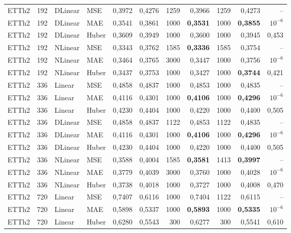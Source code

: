 {\begin{longtable}{@{}lrll rr rr rr r@{}}
\addlinespace[2pt]
ETTh2 & 192 & DLinear & MSE & 0{,}3972 & 0{,}4276 & 1259 & 0{,}3966 & 1259 & 0{,}4273 & -- \\
ETTh2 & 192 & DLinear & MAE & 0{,}3541 & 0{,}3861 & 1000 & \textbf{0{,}3531} & 1000 & \textbf{0{,}3855} & $10^{-6}$ \\
ETTh2 & 192 & DLinear & Huber & 0{,}3609 & 0{,}3949 & 1000 & 0{,}3600 & 1000 & 0{,}3945 & 0{,}453 \\
\addlinespace[2pt]
ETTh2 & 192 & NLinear & MSE & 0{,}3343 & 0{,}3762 & 1585 & \textbf{0{,}3336} & 1585 & 0{,}3754 & -- \\
ETTh2 & 192 & NLinear & MAE & 0{,}3464 & 0{,}3765 & 3000 & 0{,}3447 & 1000 & 0{,}3756 & $10^{-6}$ \\
ETTh2 & 192 & NLinear & Huber & 0{,}3437 & 0{,}3753 & 1000 & 0{,}3427 & 1000 & \textbf{0{,}3744} & 0{,}421 \\
\addlinespace[2pt]
ETTh2 & 336 & Linear & MSE & 0{,}4858 & 0{,}4837 & 1000 & 0{,}4853 & 1000 & 0{,}4835 & -- \\
ETTh2 & 336 & Linear & MAE & 0{,}4116 & 0{,}4301 & 1000 & \textbf{0{,}4106} & 1000 & \textbf{0{,}4296} & $10^{-6}$ \\
ETTh2 & 336 & Linear & Huber & 0{,}4230 & 0{,}4404 & 1000 & 0{,}4220 & 1000 & 0{,}4400 & 0{,}505 \\
\addlinespace[2pt]
ETTh2 & 336 & DLinear & MSE & 0{,}4858 & 0{,}4837 & 1122 & 0{,}4853 & 1122 & 0{,}4835 & -- \\
ETTh2 & 336 & DLinear & MAE & 0{,}4116 & 0{,}4301 & 1000 & \textbf{0{,}4106} & 1000 & \textbf{0{,}4296} & $10^{-6}$ \\
ETTh2 & 336 & DLinear & Huber & 0{,}4230 & 0{,}4404 & 1000 & 0{,}4220 & 1000 & 0{,}4400 & 0{,}505 \\
\addlinespace[2pt]
ETTh2 & 336 & NLinear & MSE & 0{,}3588 & 0{,}4004 & 1585 & \textbf{0{,}3581} & 1413 & \textbf{0{,}3997} & -- \\
ETTh2 & 336 & NLinear & MAE & 0{,}3779 & 0{,}4039 & 3000 & 0{,}3760 & 1000 & 0{,}4028 & $10^{-6}$ \\
ETTh2 & 336 & NLinear & Huber & 0{,}3738 & 0{,}4018 & 1000 & 0{,}3727 & 1000 & 0{,}4008 & 0{,}470 \\
\addlinespace[2pt]
ETTh2 & 720 & Linear & MSE & 0{,}7407 & 0{,}6116 & 1000 & 0{,}7404 & 1122 & 0{,}6115 & -- \\
ETTh2 & 720 & Linear & MAE & 0{,}5898 & 0{,}5337 & 1000 & \textbf{0{,}5893} & 1000 & \textbf{0{,}5335} & $10^{-6}$ \\
ETTh2 & 720 & Linear & Huber & 0{,}6280 & 0{,}5543 & 300 & 0{,}6277 & 300 & 0{,}5541 & 0{,}610 \\

\end{longtable}}
